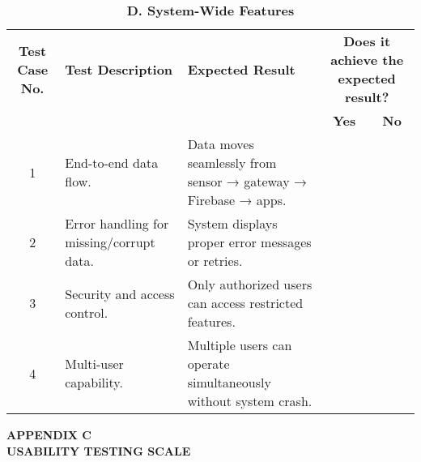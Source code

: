 {	\begin{table}[H]
		\centering
		\renewcommand{\arraystretch}{1.3}
		\caption*{\textbf{D. System-Wide Features}}
		\begin{tabular}{|c|p{4.5cm}|p{4.5cm}|c|c|}
			\hline
			\textbf{Test Case No.} & \textbf{Test Description} & \textbf{Expected Result} &
			\multicolumn{2}{|c|}{\textbf{Does it achieve the expected result?}} \\ \cline{4-5}
			& & & \textbf{Yes} & \textbf{No} \\ \hline
			1 & End-to-end data flow. & Data moves seamlessly from sensor → gateway → Firebase → apps. & & \\ \hline
			2 & Error handling for missing/corrupt data. & System displays proper error messages or retries. & & \\ \hline
			3 & Security and access control. & Only authorized users can access restricted features. & & \\ \hline
			4 & Multi-user capability. & Multiple users can operate simultaneously without system crash. & & \\ \hline
		\end{tabular}
	\end{table}
	
	\newpage
	
	\textbf{APPENDIX C}\\[1em]
	\textbf{USABILITY TESTING SCALE}
	
}
